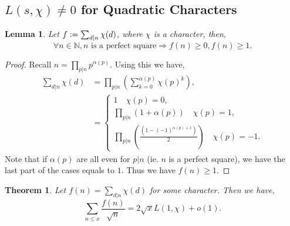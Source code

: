 \documentclass{article}
\newtheorem{theorem}{Theorem} [section]
\newtheorem{lemma}{Lemma}[section]
\newcommand{\defeq}{\vcentcolon=}
\newcommand{\N}[0]{\mathbb{N}}
\begin{document}
\subsection{$L(s,\chi)\not=0$ for Quadratic Characters}
  \begin{lemma}
    Let $f\defeq \sum_{d|n}\chi(d)$, where $\chi$ is a character, then,
    \begin{equation*}
      \forall n\in\N, \text{$n$ is a perfect square}\Rightarrow f(n)\geq 0, f(n) \geq 1.
    \end{equation*}
    \label{lemma_quadratic_lower_bound}
  \end{lemma}
  \begin{proof}
    Recall $n= \prod_{p|n}p^{\alpha(p)}$. Using this we have,
    \begin{align*}
      \sum_{d|n}\chi(d) &= \prod_{p|n}\left(\sum_{k=0}^{\alpha(p)} \chi(p)^k\right),\\
      & = \begin{cases}
        1\quad \chi(p) = 0,\\
        \prod_{p|n}(1+\alpha(p)) \quad \chi(p) = 1,\\
        \prod_{p|n}\left({\frac {(1-(-1)^{\alpha(p)+1})} {2}}\right)\quad \chi(p) = - 1.
      \end{cases}
    \end{align*} 
    Note that if $\alpha(p)$ are all even for $p|n$ (ie. $n$ is a perfect square), we have the last part of the cases equals to $1$. Thus we have $f(n)\geq1$.
  \end{proof}
  \begin{theorem}
    Let $f(n) = \sum_{d|n}\chi(d)$ for some character. Then we have,
    \begin{equation*}
      \sum_{n\leq x}{\frac {f(n)} {\sqrt{n}}}= 2\sqrt{x}L(1,\chi)+o(1).
    \end{equation*}
    \label{theorem_character_approx_sum}
  \end{theorem}
\end{document}
